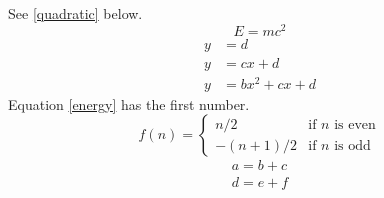 \usepackage{amsmath}
See \eqref{quadratic} below.
\begin{equation}E=mc^2\label{energy}\end{equation}
\begin{align}
y &= d\\
y &= cx+d\nonumber\\
y &= bx^2+cx+d\label{quadratic}
\end{align}
Equation \ref{energy} has the first number.
\begin{equation*}
f(n)=\begin{cases}n/2 & \text{if }n\text{ is even}\\-(n+1)/2 & \text{if }n\text{ is odd}\end{cases}
\end{equation*}
\begin{gather}a=b+c\\d=e+f\end{gather}
